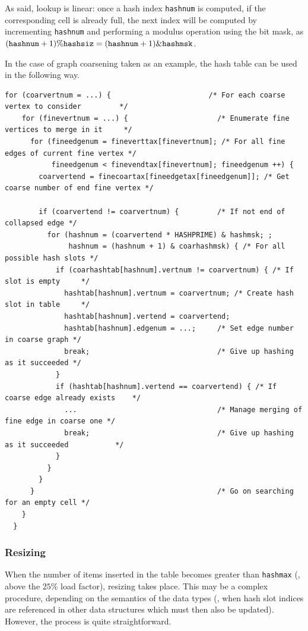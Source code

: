 As said, lookup is linear: once a hash index \texttt{hashnum} is
computed, if the corresponding cell is already full, the next index
will be computed by incrementing \texttt{hashnum} and performing
a modulus operation using the bit mask, as
$(\mbox{\texttt{hashnum}} + 1) \% \mbox{\texttt{hashsiz}} =
(\mbox{\texttt{hashnum}} + 1) \& \mbox{\texttt{hashmsk}}$.

In the case of graph coarsening taken as an example, the hash table
can be used in the following way.

\begin{lstlisting}[style=language-c]
  for (coarvertnum = ...) {                       /* For each coarse vertex to consider         */
    for (finevertnum = ...) {                     /* Enumerate fine vertices to merge in it     */
      for (fineedgenum = fineverttax[finevertnum]; /* For all fine edges of current fine vertex */
           fineedgenum < finevendtax[finevertnum]; fineedgenum ++) {
        coarvertend = finecoartax[fineedgetax[fineedgenum]]; /* Get coarse number of end fine vertex */

        if (coarvertend != coarvertnum) {         /* If not end of collapsed edge */
          for (hashnum = (coarvertend * HASHPRIME) & hashmsk; ;
               hashnum = (hashnum + 1) & coarhashmsk) { /* For all possible hash slots */
            if (coarhashtab[hashnum].vertnum != coarvertnum) { /* If slot is empty     */
              hashtab[hashnum].vertnum = coarvertnum; /* Create hash slot in table     */
              hashtab[hashnum].vertend = coarvertend;
              hashtab[hashnum].edgenum = ...;     /* Set edge number in coarse graph */
              break;                              /* Give up hashing as it succeeded */
            }
            if (hashtab[hashnum].vertend == coarvertend) { /* If coarse edge already exists    */
              ...                                 /* Manage merging of fine edge in coarse one */
              break;                              /* Give up hashing as it succeeded           */
            }
          }
        }
      }                                           /* Go on searching for an empty cell */
    }
  }
\end{lstlisting}

\subsubsection{Resizing}

When the number of items inserted in the table becomes greater than
\texttt{hashmax} (\ie, above the $25$\% load factor), resizing takes
place. This may be a complex procedure, depending on the semantics of
the data types (\eg, when hash slot indices are referenced in other
data structures which must then also be updated). However, the process
is quite straightforward.

